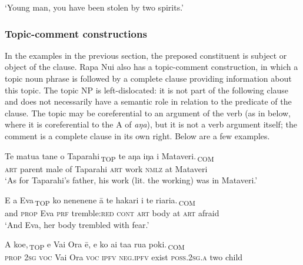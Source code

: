 \glt 
‘Young man, you have been stolen by two spirits.’ \textstyleExampleref{[R310.057]} 
\z
{}

\subsubsection[Topic{}-comment constructions]{Topic-comment constructions}\label{sec:8.6.1.3}
In the examples in the previous section, the preposed constituent is subject or object of the clause. Rapa Nui also has a topic-comment construction, in which a topic noun phrase is followed by a complete clause providing information about this topic. The topic NP is left-dislocated: it is not part of the following clause and does not necessarily have a semantic role in relation to the predicate of the clause. The topic may be coreferential to an argument of the verb (as in  below, where it is coreferential to the A of \textit{aŋa}), but it is not a verb argument itself; the comment is a complete clause in its own right. Below are a few examples. 

\ea\label{ex:8.78}
\gll {\ob}Te matu{\ꞌ}a tane o Taparahi\,{\cb}\textsubscript{\textup{TOP}} {\ob}te aŋa iŋa {\ꞌ}i Mataveri.\,{\cb}\textsubscript{\textup{COM}} \\
{\db}\textsc{art} parent male of Taparahi {\db}\textsc{art} work \textsc{nmlz} at Mataveri \\

\glt 
‘As for Taparahi’s father, his work (lit. the working) was in Mataveri.’ \textstyleExampleref{[R250.043]} 
\z

\ea\label{ex:8.79}
\gll {\ꞌ}E {\ob}a Eva\,{\cb}\textsubscript{\textup{TOP}} {\ob}ko nenenene {\ꞌ}ā te hakari {\ꞌ}i te ri{\ꞌ}ari{\ꞌ}a.\,{\cb}\textsubscript{\textup{COM}} \\
and {\db}\textsc{prop} Eva {\db}\textsc{prf} tremble:\textsc{red} \textsc{cont} \textsc{art} body at \textsc{art} afraid \\

\glt 
‘And Eva, her body trembled with fear.’ \textstyleExampleref{[R210.031]} 
\z

\ea\label{ex:8.80}
\gll {\ob}A koe,\,{\cb}\textsubscript{\textup{TOP}} e Vai Ora ē, {\ob}e ko ai ta{\ꞌ}a rua poki.\,{\cb}\textsubscript{\textup{COM}} \\
{\db}\textsc{prop} \textsc{2sg} \textsc{voc} Vai Ora \textsc{voc} {\db}\textsc{ipfv} \textsc{neg.ipfv} exist \textsc{poss.2sg.a} two child \\

